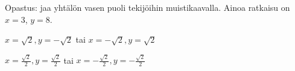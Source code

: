 \begin{Vastaus}{89}
    Opastus: jaa yhtälön vasen puoli tekijöihin muistikaavalla.
    Ainoa ratkaisu on $x = 3$, $y=8$.
    
\end{Vastaus}
\begin{Vastaus}{90}
        $x=\sqrt{2}, y=-\sqrt{2}$ tai $x=-\sqrt{2}, y=\sqrt{2}$
    
\end{Vastaus}
\begin{Vastaus}{91}
        $x=\frac{\sqrt{2}}{2}, y=\frac{\sqrt{2}}{2}$ tai $x=-\frac{\sqrt{2}}{2}, y=-\frac{\sqrt{2}}{2}$
    
\end{Vastaus}
